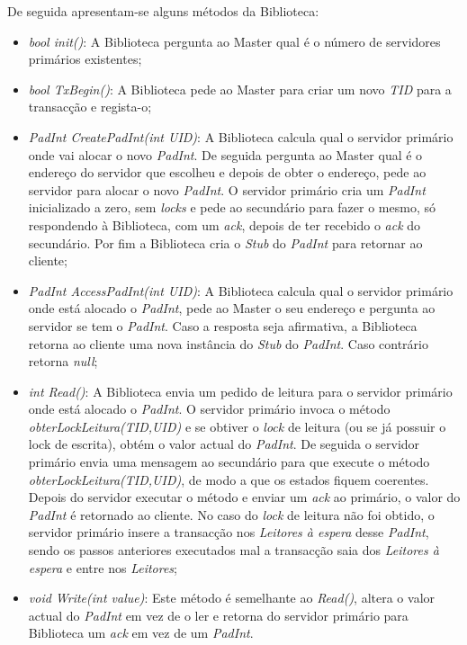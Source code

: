 De seguida apresentam-se alguns métodos da Biblioteca:
\begin{itemize}
\item \textit{bool init()}: A Biblioteca pergunta ao Master qual é o número de servidores primários existentes;
\item \textit{bool TxBegin()}: A Biblioteca pede ao Master para criar um novo \textit{TID} para a transacção e regista-o;
\item \textit{PadInt CreatePadInt(int UID)}: A Biblioteca calcula qual o servidor primário onde vai alocar o novo \textit{PadInt}. De seguida pergunta ao Master qual é o endereço do servidor que escolheu e depois de obter o endereço, pede ao servidor para alocar o novo \textit{PadInt}. O servidor primário cria um \textit{PadInt} inicializado a zero, sem \textit{locks} e pede ao secundário para fazer o mesmo, só respondendo à Biblioteca, com um \textit{ack}, depois de ter recebido o \textit{ack} do secundário. Por fim a Biblioteca cria o \textit{Stub} do \textit{PadInt} para retornar ao cliente;
\item \textit{PadInt AccessPadInt(int UID)}: A Biblioteca calcula qual o servidor primário onde está alocado o \textit{PadInt}, pede ao Master o seu endereço e pergunta ao servidor se tem o \textit{PadInt}. Caso a resposta seja afirmativa, a Biblioteca retorna ao cliente uma nova instância do \textit{Stub} do \textit{PadInt}. Caso contrário retorna \textit{null};
\item \textit{int Read()}: A Biblioteca envia um pedido de leitura para o servidor primário onde está alocado o \textit{PadInt}. O servidor primário invoca o método \textit{obterLockLeitura(TID,UID)} e se obtiver o \textit{lock} de leitura (ou se já possuir o lock de escrita), obtém o valor actual do \textit{PadInt}. De seguida o servidor primário envia uma mensagem ao secundário para que execute o método \textit{obterLockLeitura(TID,UID)}, de modo a que os estados fiquem coerentes. Depois do servidor executar o método e enviar um \textit{ack} ao primário, o valor do \textit{PadInt} é retornado ao cliente. No caso do \textit{lock} de leitura não foi obtido, o servidor primário insere a transacção nos \textit{Leitores à espera} desse \textit{PadInt}, sendo os passos anteriores executados mal a transacção saia dos \textit{Leitores à espera} e entre nos \textit{Leitores};
\item \textit{void Write(int value)}: Este método é semelhante ao \textit{Read()}, altera o valor actual do \textit{PadInt} em vez de o ler e retorna do servidor primário para Biblioteca um \textit{ack} em vez de um \textit{PadInt}.
\end{itemize}